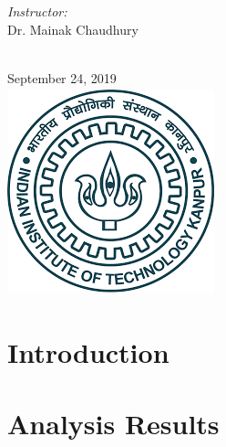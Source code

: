 \documentclass[12pt]{article}
\begin{document}
\begin{titlepage}
\begin{minipage}{0.4\textwidth}
\end{minipage}
\begin{minipage}{0.4\textwidth}
\begin{flushright} \large
\emph{Instructor:} \\
Dr. Mainak Chaudhury %
\end{flushright}
\end{minipage}\\[1cm]
{\large September 24, 2019}\\[1cm] %
\includegraphics[width=6cm,height=6cm,keepaspectratio]{iitk.png}%
\vfill %

\end{titlepage}
\newpage

\section{Introduction}


%

\section{Analysis Results}


%


% 
%
\end{document}
